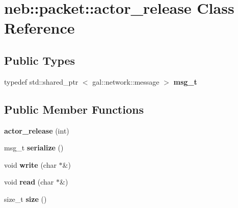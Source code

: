 \hypertarget{classneb_1_1packet_1_1actor__release}{\section{neb\-:\-:packet\-:\-:actor\-\_\-release \-Class \-Reference}
\label{classneb_1_1packet_1_1actor__release}
}
\subsection*{\-Public \-Types}
\begin{DoxyCompactItemize}
\item 
\hypertarget{classneb_1_1packet_1_1actor__release_a00cd43364472a514dd494ff623b38435}{typedef std\-::shared\-\_\-ptr\*
$<$ gal\-::network\-::message $>$ {\bfseries msg\-\_\-t}}\label{classneb_1_1packet_1_1actor__release_a00cd43364472a514dd494ff623b38435}

\end{DoxyCompactItemize}
\subsection*{\-Public \-Member \-Functions}
\begin{DoxyCompactItemize}
\item 
\hypertarget{classneb_1_1packet_1_1actor__release_a427941df801ea77f69c914b2cc15519e}{{\bfseries actor\-\_\-release} (int)}\label{classneb_1_1packet_1_1actor__release_a427941df801ea77f69c914b2cc15519e}

\item 
\hypertarget{classneb_1_1packet_1_1actor__release_ae798345bb4f2a39ebaba785036d1da89}{msg\-\_\-t {\bfseries serialize} ()}\label{classneb_1_1packet_1_1actor__release_ae798345bb4f2a39ebaba785036d1da89}

\item 
\hypertarget{classneb_1_1packet_1_1actor__release_a4ac4e4dd9da7391390d84e3549a590ff}{void {\bfseries write} (char $\ast$\&)}\label{classneb_1_1packet_1_1actor__release_a4ac4e4dd9da7391390d84e3549a590ff}

\item 
\hypertarget{classneb_1_1packet_1_1actor__release_a510a1b4586257e3bd25766e2f29f4239}{void {\bfseries read} (char $\ast$\&)}\label{classneb_1_1packet_1_1actor__release_a510a1b4586257e3bd25766e2f29f4239}

\item 
\hypertarget{classneb_1_1packet_1_1actor__release_a8068e8fa32dc9e51670dcea7e20ef8d6}{size\-\_\-t {\bfseries size} ()}\label{classneb_1_1packet_1_1actor__release_a8068e8fa32dc9e51670dcea7e20ef8d6}

\end{DoxyCompactItemize}
